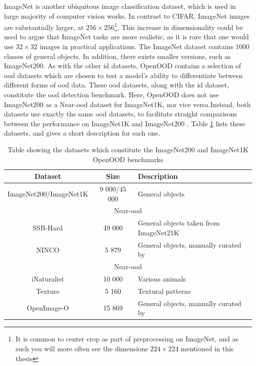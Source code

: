 \documentclass[UKenglish]{uiomasterthesis} %
\theoremstyle{definition}
\begin{document}
ImageNet is another ubiquitous image classification dataset, which is used in large majority of computer vision works. In contrast to CIFAR, ImageNet images are substantially larger, at $256 \times 256$\footnote{It is common to center crop as part of preprocessing on ImageNet, and as such you will more often see the dimensions $224 \times 224$ mentioned in this thesis}. This increase in dimensionality could be used to argue that ImageNet tasks are more realistic, as it is rare that one would use $32 \times 32$ images in practical applications. The ImageNet dataset contains 1000 classes of general objects. In addition, there exists smaller versions, such as ImageNet200. As with the other \ac{id} datasets, OpenOOD contains a selection of \ac{ood} datasets which are chosen to test a model's ability to differentiate between different forms of \ac{ood} data. These \ac{ood} datasets, along with the \ac{id} dataset, constitute the \ac{ood} detection benchmark. Here, OpenOOD does not use ImageNet200 as a Near-\ac{ood} dataset for ImageNet1K, nor vice versa.Instead, both datasets use exactly the same \ac{ood} datasets, to facilitate straight comparisons between the performance on ImageNet1K and ImageNet200 \cite{openood15}. Table \ref{table:imagenet200} lists these datasets, and gives a short description for each one.

\begin{table}[h]
\begin{center}
\begin{tabular}{ |c|c|l| } 
    \hline
    Dataset & Size & Description \\
    \hline
    \rowcolor{id!50}
    ImageNet200/ImageNet1K & 9 000/45 000 & General objects \\ 
    \hline
    \hline
    \multicolumn{3}{|c|}{Near-\ac{ood}} \\
    \hline
    \rowcolor{near!50}
    SSB-Hard & 49 000 & General objects taken from ImageNet21K \\ 
    \rowcolor{near!50}
    NINCO & 5 879 & General objects, manually curated by \cite{bitterwolf2023ninco} \\ 
    \hline
    \hline
    \multicolumn{3}{|c|}{Near-\ac{ood}} \\
    \hline
    \rowcolor{far!50}
    iNaturalist & 10 000 & Various animals \\ 
    \rowcolor{far!50}
    Texture & 5 160 & Textural patterns \\ 
    \rowcolor{far!50}
    OpenImage-O & 15 869 & General objects, manually curated by \cite{vim} \\ 
    \hline
    \end{tabular}
    \caption[ImageNet benchmark datasets]{Table showing the datasets which constitute the ImageNet200 and ImageNet1K OpenOOD benchmarks}
    \label{table:imagenet200}
\end{center}
\end{table}
\end{document}
